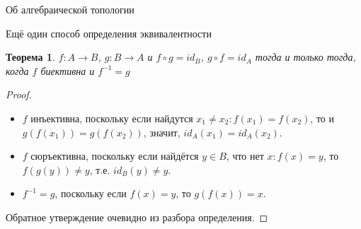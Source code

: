 \documentclass[aspectratio=169,dvipsnames,usenames]{beamer}
\begin{document}
\newtheorem{dfn}{Определение}[section]
\newtheorem{nte}{Замечание}[section]

\newtheorem{axiom}{Аксиома}[section]
\newtheorem{thm}{Теорема}[section]
\newtheorem{lmm}[theorem]{Лемма}
\newtheorem{statement}{Утверждение}[section]
\newtheorem{oun_paragraph}{Пункт}[section]
\newtheorem{cons}{Следствие}[section]
\newtheorem*{exm}{Пример}

\newcommand{\comb}[1]{\operatorname{\mathcal{#1}}}
\newcommand{\func}[1]{\operatorname{#1}}
\newcommand{\reduction}[1]{{\color{OrangeRed}#1}}
\newcommand{\set}[1]{\left\{#1\right\}}

\def\from#1{\par \parbox{0.7\textwidth}{\par \hfill\raggedleft \it #1}} 

\begin{frame}{}
\begin{center}
{\LARGE Об алгебраической топологии}
\end{center}
\end{frame}

\begin{frame}{Ещё один способ определения эквивалентности}
\begin{thm}$f: A \rightarrow B$, $g : B \rightarrow A$ и $f \circ g = id_B$, $g \circ f = id_A$ тогда и только тогда, когда $f$ биективна и $f^{-1} = g$\end{thm}
\begin{proof}
\begin{itemize}
\item $f$ инъективна, поскольку если найдутся $x_1 \ne x_2: f(x_1) = f(x_2)$, то и $g(f(x_1)) = g(f(x_2))$, значит, $id_A(x_1) = id_A(x_2)$.
\item $f$ сюръективна, поскольку если найдётся $y \in B$, что нет $x : f(x) = y$, то $f(g(y)) \ne y$, т.е. $id_B(y) \ne y$.
\item $f^{-1} = g$, поскольку если $f(x) = y$, то $g(f(x)) = x$.
\end{itemize}

Обратное утверждение очевидно из разбора определения.
\end{proof}
\end{frame}
\end{document}
